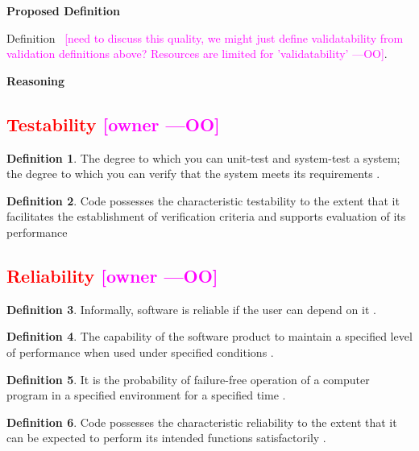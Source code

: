 \documentclass[letterpaper,cleveref]{lipics-v2019}
\newcommand{\authornote}[3]{\textcolor{#1}{[#3 ---#2]}}
\newcommand{\authornote}[3]{}
\newcommand{\oo}[1]{\authornote{magenta}{OO}{#1}} %
\newcommand{\notdone}[1]{\textcolor{red}{#1}}
\theoremstyle{definition}
\newtheorem{defn}{Definition}
\begin{document}
\noindent \textbf{Proposed Definition}

Definition~ \oo{need to discuss this quality, we might just define
  validatability from validation definitions above? Resources are limited for
  'validatability'}.

\noindent \textbf{Reasoning}

\subsection{\notdone{Testability} \oo{owner}}

\begin{defn}
	The degree to which you can unit-test and system-test a system;
	the degree to which you can verify that the system meets its requirements \citep{mcconnell2004code}.
\end{defn}

\begin{defn}
	Code possesses the characteristic testability to the extent that it
    facilitates the establishment of verification criteria and supports
    evaluation of its performance \citep{boehm1976quantitative}
\end{defn}

\subsection{\notdone{Reliability} \oo{owner}}

\begin{defn}
  Informally, software is reliable if the user can depend on it \citep{GhezziEtAl2003}.
\end{defn}

\begin{defn}
 The capability of the software product to maintain a specified level of performance when used under specified conditions \cite{ISO9126}.
\end{defn}
\begin{defn} \label{reliabilitySelected1} It is the probability of failure-free
  operation of a computer program in a specified environment for a specified
  time \citep{musa1987software}.
\end{defn} 
    
\begin{defn}
  Code possesses the characteristic reliability to the extent that it can be
  expected to perform its intended functions satisfactorily
  \citep{boehm1976quantitative}.
\end{defn}
\end{document}
